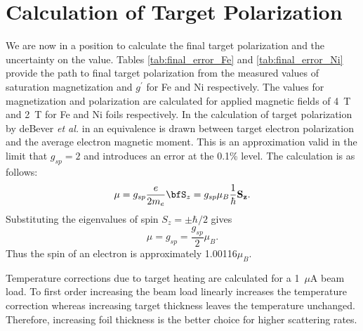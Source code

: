 \documentclass[12pt]{article}
\begin{document}
\section{Calculation of Target Polarization}\label{sec:final_calc}
We are now in a position to calculate the final target polarization and the uncertainty on the value. Tables \ref{tab:final_error_Fe} and \ref{tab:final_error_Ni} provide the path to final target polarization from the measured values of saturation magnetization and $g^{\prime}$ for Fe and Ni respectively. The values for magnetization and polarization are calculated for applied magnetic fields of 4~T and 2~T for Fe and Ni foils respectively. In the calculation of target polarization by deBever {\it et al.} in \cite{deBever1997} an equivalence is drawn between target electron polarization and the average electron magnetic moment. This is an approximation valid in the limit that $g_{sp}=2$ and introduces an error at the 0.1\% level. The calculation is as follows:
\[
{\bf\mu}=g_{sp}\frac{e}{2m_e}{\bfS_z}=g_{sp}\mu_B\frac{1}{\hbar}{\bf S_z}.
\]
Substituting the eigenvalues of spin $S_z=\pm\hbar/2$ gives
\[
\mu=g_{sp}=\frac{g_{sp}}{2}\mu_B.
\]
Thus the spin of an electron is approximately 1.00116$\mu_B$.

Temperature corrections due to target heating are calculated for a 1~$\mu$A beam load. To first order increasing the beam load linearly increases the temperature correction whereas increasing target thickness leaves the temperature unchanged. Therefore, increasing foil thickness is the better choice for higher scattering rates.
\end{document}
